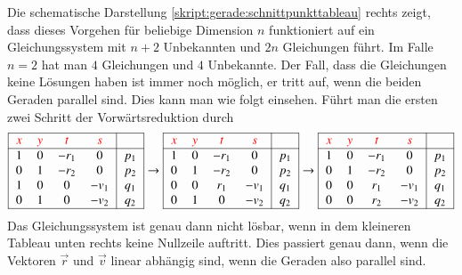 Die schematische Darstellung 
\eqref{skript:gerade:schnittpunkttableau}
rechts zeigt, dass dieses Vorgehen für beliebige Dimension $n$
funktioniert auf ein Gleichungssystem mit $n+2$ Unbekannten und
$2n$ Gleichungen führt.
Im Falle $n=2$ hat man $4$ Gleichungen und $4$ Unbekannte.
Der Fall, dass die Gleichungen keine Lösungen haben ist immer noch
möglich, er tritt auf, wenn die beiden Geraden parallel sind.
Dies kann man wie folgt einsehen.
Führt man die ersten zwei Schritt der Vorwärtsreduktion durch
\[
\begin{tabular}{|>{$}c<{$}>{$}c<{$}>{$}c<{$}>{$}c<{$}|>{$}c<{$}|}
\hline
\color{red}x&\color{red}y&\color{red}t&\color{red}s&\\
\hline
1&0&-r_1&   0&p_1\\
0&1&-r_2&   0&p_2\\
1&0&   0&-v_1&q_1\\
0&1&   0&-v_2&q_2\\
\hline
\end{tabular}
\rightarrow
\begin{tabular}{|>{$}c<{$}>{$}c<{$}>{$}c<{$}>{$}c<{$}|>{$}c<{$}|}
\hline
\color{red}x&\color{red}y&\color{red}t&\color{red}s&\\
\hline
1&0&-r_1&   0&p_1\\
0&1&-r_2&   0&p_2\\
0&0& r_1&-v_1&q_1\\
0&1&   0&-v_2&q_2\\
\hline
\end{tabular}
\rightarrow
\begin{tabular}{|>{$}c<{$}>{$}c<{$}>{$}c<{$}>{$}c<{$}|>{$}c<{$}|}
\hline
\color{red}x&\color{red}y&\color{red}t&\color{red}s&\\
\hline
1&0&-r_1&   0&p_1\\
0&1&-r_2&   0&p_2\\
0&0& r_1&-v_1&q_1\\
0&0& r_2&-v_2&q_2\\
\hline
\end{tabular}
\]
Das Gleichungssystem ist genau dann nicht lösbar, wenn in dem kleineren
Tableau unten rechts keine Nullzeile auftritt.
Dies passiert genau dann, wenn die Vektoren $\vec{r}$ und $\vec{v}$ 
linear abhängig sind, wenn die Geraden also parallel sind.

%
%
